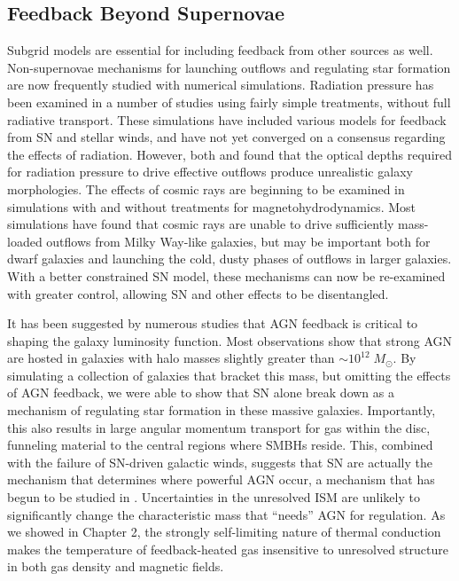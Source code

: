 \subsection{Feedback Beyond Supernovae}
Subgrid models are essential for including feedback from other sources as well.
Non-supernovae mechanisms for launching outflows and regulating star formation
are now frequently studied with numerical simulations.  Radiation pressure has been
examined in a number of studies \citep{Hopkins2014,Roskar2014,Agertz2015} using
fairly simple treatments, without full radiative transport.  These simulations
have included various models for feedback from SN and stellar winds, and have
not yet converged on a consensus regarding the effects of radiation.  However,
both \citet{Roskar2014} and \citet{Agertz2015} found that the optical depths
required for radiation pressure to drive effective outflows produce unrealistic
galaxy morphologies.  The effects of cosmic rays are beginning to be examined in
simulations with \citep{Girichidis2015} and without
\citep{Jubelgas2008,Booth2013} treatments for magnetohydrodynamics.  Most
simulations have found that cosmic rays are unable to drive sufficiently
mass-loaded outflows from Milky Way-like galaxies, but may be important both for
dwarf galaxies and launching the cold, dusty phases of outflows in larger
galaxies.  With a better constrained SN model, these mechanisms can now be
re-examined with greater control, allowing SN and other effects to be
disentangled.

It has been suggested by numerous studies \citep{Benson2003,Bower2006} that AGN
feedback is critical to shaping the galaxy luminosity function.  Most
observations \citep{Kauffmann2003b} show that strong AGN are hosted in galaxies
with halo masses slightly greater than $\sim10^{12}\;M_\odot$.  By simulating a
collection of galaxies that bracket this mass, but omitting the effects of AGN
feedback, we were able to show that SN alone break down as a mechanism of
regulating star formation in these massive galaxies.  Importantly, this also
results in large angular momentum transport for gas within the disc, funneling
material to the central regions where SMBHs reside.  This, combined with the
failure of SN-driven galactic winds, suggests that SN are actually the mechanism
that determines where powerful AGN occur, a mechanism that has begun to be studied in
\citet{Bower2016}.  Uncertainties in the unresolved ISM are unlikely to
significantly change the characteristic mass that ``needs'' AGN for regulation.
As we showed in Chapter 2, the strongly self-limiting nature of thermal
conduction makes the temperature of feedback-heated gas insensitive to unresolved
structure in both gas density and magnetic fields.

